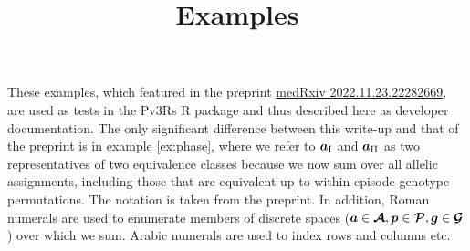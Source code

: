 \documentclass{article}
\title{Examples}
\date{}
\author{}
\begin{document}
\maketitle

These examples, which featured in the preprint \href{https://doi.org/10.1101/2022.11.23.22282669}{medRxiv 2022.11.23.22282669}, are used as tests in the Pv3Rs R package and thus described here as developer documentation. The only significant difference between this write-up and that of the preprint is in example \ref{ex:phase}, where we refer to $\bm{a}_\RN{1}$ and $\bm{a}_\RN{2}$ as two representatives of two equivalence classes because we now sum over all allelic assignments, including those that are equivalent up to within-episode genotype permutations. 
%
The notation is taken from the preprint. In addition, Roman numerals are used to enumerate members of discrete spaces ($\bm{a}\in\bm{\mathcal{A}}, \bm{p}\in\bm{\mathcal{P}},\bm{g}\in\bm{\mathcal{G}}$) over which we sum. Arabic numerals are used to index rows and columns etc. 
\end{document}
